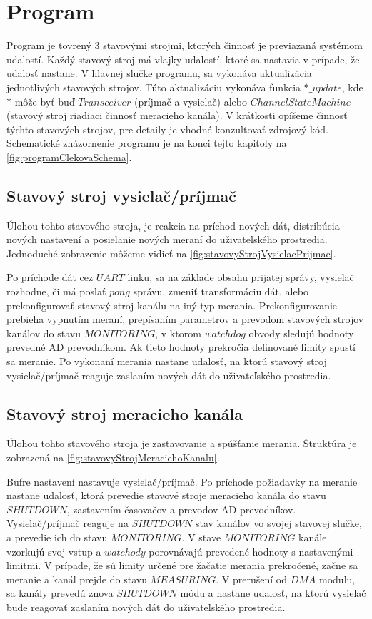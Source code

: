 \documentclass[main.tex]{subfiles}
\begin{document}
	\section{Program}
		\begin{multicols*}{2}
			\noindent Program je tovrený 3 stavovými strojmi, ktorých činnosť je previazaná systémom udalostí. Každý stavový stroj má vlajky udalostí, ktoré sa nastavia v prípade, že udalosť nastane. V hlavnej slučke programu, sa vykonáva aktualizácia jednotlivých stavových strojov. Túto aktualizáciu vykonáva funkcia $*\_update$, kde $*$ môže byť buď $Transceiver$ (príjmač a vysielač) alebo $ChannelStateMachine$ (stavový stroj riadiaci činnosť meracieho kanála). V krátkosti opíšeme činnosť týchto stavových strojov, pre detaily je vhodné konzultovať zdrojový kód. Schematické znázornenie programu je na konci tejto kapitoly na \cref{fig:programClekovaSchema}.
			
			\subsection{Stavový stroj vysielač/príjmač}
			Úlohou tohto stavového stroja, je reakcia na príchod nových dát, distribúcia nových nastavení a posielanie nových meraní do uživateľského prostredia. Jednoduché zobrazenie môžeme vidieť na \cref{fig:stavovyStrojVysielacPrijmac}.
			
			Po príchode dát cez $UART$ linku, sa na základe obsahu prijatej správy, vysielač rozhodne, či má poslať $pong$ správu, zmeniť transformáciu dát, alebo prekonfigurovať stavový stroj kanálu na iný typ merania. Prekonfigurovanie prebieha vypnutím meraní, prepísaním parametrov a prevodom stavových strojov kanálov do stavu $MONITORING$, v ktorom $watchdog$ obvody sledujú hodnoty prevedné AD prevodníkom. Ak tieto hodnoty prekročia definované limity spustí sa meranie. Po vykonaní merania nastane udalosť, na ktorú stavový stroj vysielač/príjmač reaguje zaslaním nových dát do uživateľského prostredia.
			
			
			\vskip 0.25cm
			
			\subsection{Stavový stroj meracieho kanála}
			Úlohou tohto stavového stroja je zastavovanie a spúšťanie merania. Štruktúra je zobrazená na \cref{fig:stavovyStrojMeraciehoKanalu}.

			Bufre nastavení nastavuje vysielač/príjmač. Po príchode požiadavky na meranie nastane udalosť, ktorá prevedie stavové stroje meracieho kanála do stavu $SHUTDOWN$, zastavením časovačov a prevodov AD prevodníkov. Vysielač/príjmač reaguje na $SHUTDOWN$ stav kanálov vo svojej stavovej slučke, a prevedie ich do stavu $MONITORING$. V stave $MONITORING$ kanále vzorkujú svoj vstup a $watchody$ porovnávajú prevedené hodnoty s nastavenými limitmi. V prípade, že sú limity určené pre žačatie merania prekročené, začne sa meranie a kanál prejde do stavu $MEASURING$. V prerušení od $DMA$ modulu, sa kanály prevedú znova $SHUTDOWN$ módu a nastane udalosť, na ktorú vysielač bude reagovať zaslaním nových dát do uživateľského prostredia.
			
			
			\vskip 0.25cm
		\end{multicols*}
		
\end{document}
